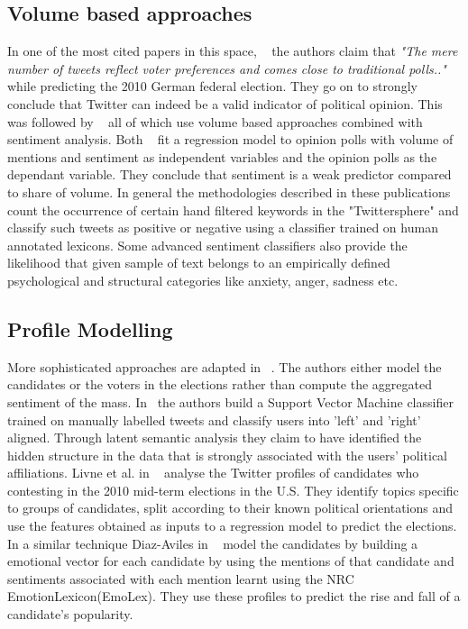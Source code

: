 \subsection{Volume based approaches}
In one of the most cited papers in this space, ~\cite{tumasjan2010predicting} the authors claim that 
\emph{ "The mere number of tweets reflect voter preferences and comes close to  traditional polls.."}
while predicting  the 2010 German federal election. %
They go on to strongly conclude that Twitter can indeed be a valid indicator of political opinion.
This was followed by ~\cite{o2010tweets,saez2011total,bermingham2011using,demartini2011analyzing} all of which use volume based approaches combined with sentiment analysis.
Both ~\cite{o2010tweets,bermingham2011using} fit a regression model to opinion polls with volume of mentions and sentiment as independent variables and the opinion polls as the dependant variable. 
They conclude that sentiment is a weak predictor compared to share of volume.
\newline In general the methodologies described in these publications count the occurrence of certain hand filtered keywords in the "Twittersphere" and classify such tweets as positive or negative using a classifier trained on human annotated lexicons.
Some advanced sentiment classifiers also provide the likelihood that given sample of text belongs to an empirically defined psychological and structural categories like anxiety, anger, sadness etc.

\subsection{Profile Modelling}
More sophisticated approaches are adapted in ~\cite{livne2011party,conover2011predicting,diaz2012taking}. 
The authors either model the candidates or the voters in the elections rather than compute the aggregated sentiment of the mass.  
In~\cite{conover2011predicting} the authors build a Support Vector Machine classifier trained on manually labelled tweets and classify users into 'left' and 'right' aligned.
Through latent semantic analysis they claim to have identified the hidden structure in the data that is strongly associated with the users' political affiliations.
Livne et al. in ~\cite{livne2011party} analyse the Twitter profiles of candidates who contesting in the 2010 mid-term elections in the U.S. 
They identify topics specific to groups of candidates, split according to their known political orientations and use the features obtained as inputs to a regression model to predict the elections. 
In a similar technique Diaz-Aviles in ~\cite{diaz2012taking} model the candidates by building a emotional vector for each candidate by using the mentions of that candidate and sentiments associated with each mention learnt using the NRC EmotionLexicon(EmoLex). 
They use these profiles to predict the rise and fall of a candidate's popularity. 

